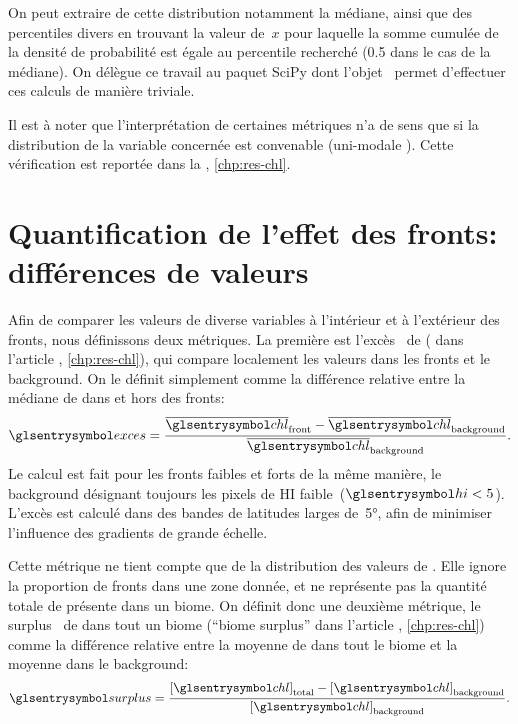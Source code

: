 On peut extraire de cette distribution notamment la médiane, ainsi que des percentiles divers en trouvant la valeur de~\(x\) pour laquelle la somme cumulée de la densité de probabilité est égale au percentile recherché (0.5 dans le cas de la médiane).
On délègue ce travail au paquet SciPy dont l'objet~ permet d'effectuer ces calculs de manière triviale.

Il est à noter que l'interprétation de certaines métriques n'a de sens que si la distribution de la variable concernée est convenable (uni-modale ).
Cette vérification est reportée dans la , \cref*{chp:res-chl}.

\section{Quantification de l'effet des fronts: différences de valeurs}
\label{sec:extraction-surplus-lag}

Afin de comparer les valeurs de diverse variables à l'intérieur et à l'extérieur des fronts, nous définissons deux métriques.
La première est l'excès~ de  ( dans l'article , \cref*{chp:res-chl}), qui compare localement les valeurs dans les fronts et le background. On le définit simplement comme la différence relative entre la médiane de  dans et hors des fronts:
\begin{equation}
  \am{exces} = \frac{\med{\am{chl}}_\frt - \med{\am{chl}}_\bkg}
  {\med{\am{chl}}_\bkg} .
\end{equation}
Le calcul est fait pour les fronts faibles et forts de la même manière, le background désignant toujours les pixels de HI faible~(\(\am{hi} < 5\)).
L'excès est calculé dans des bandes de latitudes larges de~\ang[mode=math]{5}, afin de minimiser l'influence des gradients de grande échelle.

Cette métrique ne tient compte que de la distribution des valeurs de . Elle ignore la proportion de fronts dans une zone donnée, et ne représente pas la quantité totale de  présente dans un biome.
On définit donc une deuxième métrique, le surplus~ de  dans tout un biome (\enquote{biome surplus} dans l'article , \cref*{chp:res-chl}) comme la différence relative entre la moyenne de  dans tout le biome et la moyenne dans le background:
\begin{equation}
  \am{surplus} = \frac{\moy{\am{chl}}_\tot - \moy{\am{chl}}_\bkg}
  {\moy{\am{chl}}_\bkg} .
\end{equation}

